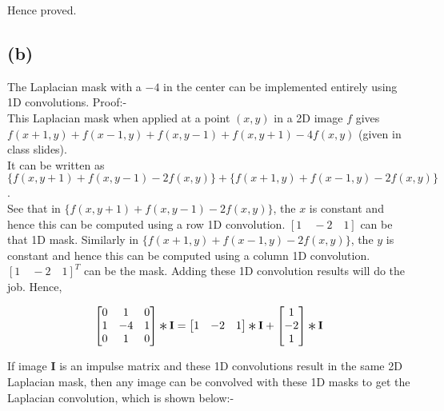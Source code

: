 \documentclass[12pt]{article}
\newcommand{\Conv}{\mathop{\scalebox{1.5}{\raisebox{-0.2ex}{$\ast$}}}}
\begin{document}
Hence proved.

\subsection*{(b)}
The Laplacian mask with a $-4$ in the center can be implemented entirely using 1D convolutions. Proof:- \\

This Laplacian mask when applied at a point $(x, y)$ in a 2D image $f$ gives $f(x+1, y) + f(x-1, y) + f(x, y-1) + f(x, y+1) - 4f(x, y)$ (given in class slides). \\

It can be written as $\{f(x, y+1) + f(x, y-1) - 2f(x, y)\} + \{f(x+1, y) + f(x-1, y) - 2f(x, y)\}$. \\

See that in $\{f(x, y+1) + f(x, y-1) - 2f(x, y)\}$, the $x$ is constant and hence this can be computed using a row 1D convolution. $[1 \quad -2 \quad 1]$ can be that 1D mask. Similarly in $\{f(x+1, y) + f(x-1, y) - 2f(x, y)\}$, the $y$ is constant and hence this can be computed using a column 1D convolution. $[1 \quad -2 \quad 1]^T$ can be the mask. Adding these 1D convolution results will do the job. Hence,

\[
\begin{bmatrix}
0 & 1 & 0 \\
1 & -4 & 1 \\
0 & 1 & 0
\end{bmatrix}
\Conv
\mathbf{I}
=
\begin{bmatrix}
1 & -2 & 1
\end{bmatrix}
\Conv
\mathbf{I}
+
\begin{bmatrix}
1 \\
-2 \\
1
\end{bmatrix}
\Conv
\mathbf{I}
\]

If image \textbf{I} is an impulse matrix and these 1D convolutions result in the same 2D Laplacian mask, then any image can be convolved with these 1D masks to get the Laplacian convolution, which is shown below:-
\end{document}
